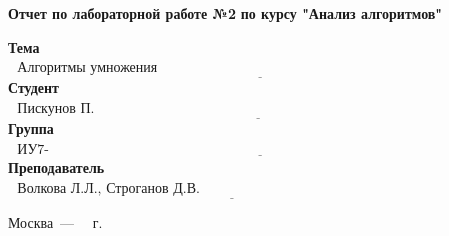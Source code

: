 \begin{titlepage}
	\begin{center}
		\Large\textbf{Отчет по лабораторной работе №2}
		\Large\textbf{по курсу "Анализ алгоритмов"}
	\end{center}
	\text{}\newline
	
	\noindent\textbf{Тема} $\underline{\text{~~Алгоритмы умножения матриц~~~~~~~~~~~~~~~~~~~~~~~~~~~~~~~~~~~~~~~~~~~~~~~~~~~~~~~~~~~~~~~~~~~~}}$\newline\newline\newline
	\noindent\textbf{Студент} $\underline{\text{~~Пискунов П.~~~~~~~~~~~~~~~~~~~~~~~~~~~~~~~~~~~~~~~~~~~~~~~~~~~~~~~~~~~~~~~~~~~~~~~~~~~~~~~~~~~~~~~~~}}$\newline\newline
	\noindent\textbf{Группа} $\underline{\text{~~ИУ7-56Б~~~~~~~~~~~~~~~~~~~~~~~~~~~~~~~~~~~~~~~~~~~~~~~~~~~~~~~~~~~~~~~~~~~~~~~~~~~~~~~~~~~~~~~~~~~~~~~~}}$\newline\newline
	\noindent\textbf{Преподаватель} $\underline{\text{~~Волкова Л.Л., Строганов Д.В.~~~~~~~~~~~~~~~~~~~~~~~~~~~~~~~~~~~~~~~~~~~~~~~~~~~~~~~}}$\newline
	
	\begin{center}
		\vfill
		Москва~---~\the\year
		~г.
	\end{center}
	\restoregeometry
	
\end{titlepage}